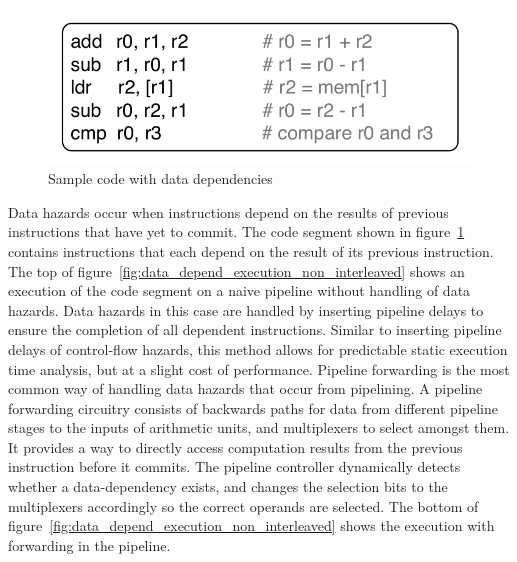 \begin{figure}
  \vspace{-20pt}
  \begin{center}
    \includegraphics[scale=.65]{figs/sample_data_dependent_code}
  \end{center}
  \vspace{-20pt}
  \caption{Sample code with data dependencies}
  \label{fig:sample_data_dependent_code}
\end{figure}
Data hazards occur when instructions depend on the results of previous instructions that have yet to commit.
The code segment shown in figure~\ref{fig:sample_data_dependent_code} contains instructions that each depend on the result of its previous instruction.
The top of figure~\ref{fig:data_depend_execution_non_interleaved} shows an execution of the code segment on a naive pipeline without handling of data hazards. 
Data hazards in this case are handled by inserting pipeline delays to ensure the completion of all dependent instructions.
Similar to inserting pipeline delays of control-flow hazards, this method allows for predictable static execution time analysis, but at a slight cost of performance. 
Pipeline forwarding is the most common way of handling data hazards that occur from pipelining.  
A pipeline forwarding circuitry consists of backwards paths for data from different pipeline stages to the inputs of arithmetic units, and multiplexers to select amongst them. 
It provides a way to directly access computation results from the previous instruction before it commits. 
The pipeline controller dynamically detects whether a data-dependency exists, and changes the selection bits to the multiplexers accordingly so the correct operands are selected.
The bottom of figure~\ref{fig:data_depend_execution_non_interleaved} shows the execution with forwarding in the pipeline.

